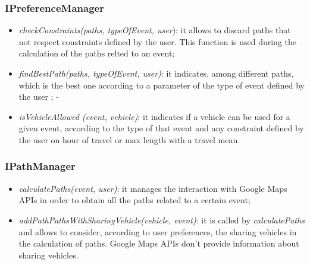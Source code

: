 \subsubsection{IPreferenceManager}
\begin{itemize}
\item \textit{checkConstraints(paths, typeOfEvent, user}): it allows to discard paths that not respect constraints defined by the user. This function is used during the calculation of the paths relted to an event;
\item \textit{findBestPath(paths, typeOfEvent, user)}: it indicates, among different paths, which is the best one according to a parameter of the type of event defined by the user ;
-\item \textit{isVehicleAllowed (event, vehicle)}: it indicates if a vehicle can be used for a given event, according to the type of that event and any constraint defined by the user on hour of travel or max length with a travel mean.
\end{itemize}
\subsubsection{IPathManager}
\begin{itemize}
\item \textit{calculatePaths(event, user)}: it manages the interaction with Google Maps APIs in order to obtain all the paths related to a certain event;
\item \textit{addPathPathsWithSharingVehicle(vehicle, event)}: it is called by \textit{calculatePaths} and allows to consider, according to user preferences, the sharing vehicles in the calculation of paths. Google Maps APIs don't provide information about sharing vehicles. 

\end{itemize}